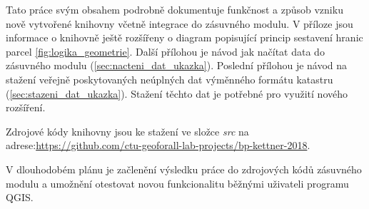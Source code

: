 Tato práce svým obsahem podrobně dokumentuje funkčnost a způsob vzniku
nově vytvořené knihovny včetně integrace do zásuvného modulu. V příloze jsou informace o knihovně ještě
rozšířeny o diagram popisující princip sestavení hranic
parcel \ref{fig:logika_geometrie}. Další přílohou je návod jak načítat
data do zásuvného modulu (\ref{sec:nacteni_dat_ukazka}). Poslední
přílohou je návod na stažení veřejně poskytovaných neúplných dat
výměnného formátu katastru (\ref{sec:stazeni_dat_ukazka}). Stažení
těchto dat je potřebné pro využití nového rozšíření.

Zdrojové kódy knihovny jsou ke stažení ve složce \textit{src} na adrese:\newline \href{https://github.com/ctu-geoforall-lab-projects/bp-kettner-2018}{https://github.com/ctu-geoforall-lab-projects/bp-kettner-2018}.

V dlouhodobém plánu je začlenění výsledku práce do zdrojových kódů
zásuvného modulu a umožnění otestovat novou funkcionalitu běžnými
uživateli programu QGIS.
